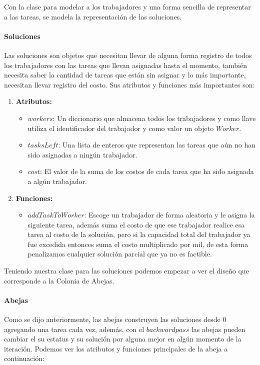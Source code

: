\documentclass[12pt]{article}
\begin{document}
	Con la clase para modelar a los trabajadores y una forma sencilla de 
	representar a las tareas, se modela la representación de las soluciones.
	
	\paragraph{Soluciones} Las soluciones son objetos que necesitan llevar de alguna
	forma registro de todos los trabajadores con las tareas que llevan asignadas hasta
	el momento, también necesita saber la cantidad de tareas que están sin asignar y
	lo más importante, necesitan llevar registro del costo.
	Sus atributos y funciones más importantes son:
	
	\begin{enumerate}
		\item \textbf{Atributos:}
		\begin{itemize}
			\item $workers$: Un diccionario que almacena todos los trabajadores y como 
			llave utiliza el identificador del trabajador y como valor un objeto 
			$Worker$.
			\item $tasksLeft$: Una lista de enteros que representan las tareas que 
			aún no han sido asignadas a ningún trabajador.
			\item $cost$: El valor de la suma de los costos de cada tarea que ha sido 
			asignada a algún trabajador.
		\end{itemize}
		\item \textbf{Funciones:}
		\begin{itemize}
			\item $addTaskToWorker$: Escoge un trabajador de forma aleatoria y le 
			asigna la siguiente tarea, además suma el costo de que ese trabajador 
			realice esa tarea al costo de la solución, pero si la capacidad total del
			trabajador ya fue excedida entonces suma el costo multiplicado por mil, de
			esta forma penalizamos cualquier solución parcial que ya no es factible.
		\end{itemize}
	\end{enumerate}
	
	Teniendo nuestra clase para las soluciones podemos empezar a ver el diseño que 
	corresponde a la Colonia de Abejas.
	
	\paragraph{Abejas}
	Como se dijo anteriormente, las abejas construyen las soluciones desde 0 agregando
	una tarea cada vez, además, con el $backwardpass$ las abejas pueden cambiar el 
	su estatus y su solución por alguna mejor en algún momento de la iteración.
	Podemos ver los atributos y funciones principales de la abeja a continuación:
	
\end{document}
